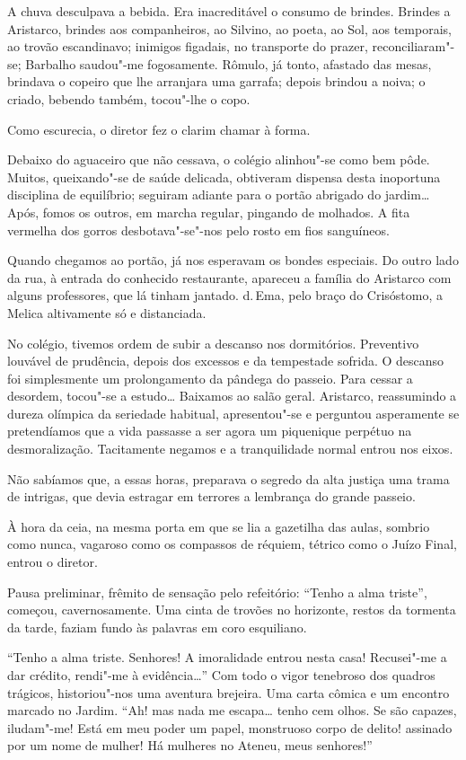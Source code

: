 A chuva desculpava a bebida.
Era inacreditável o consumo de brindes. Brindes a Aristarco, brindes
aos companheiros, ao Silvino, ao poeta, ao Sol, aos temporais, ao
trovão escandinavo; inimigos figadais, no transporte do prazer,
reconciliaram"-se; Barbalho saudou"-me fogosamente. Rômulo, já tonto,
afastado das mesas, brindava o copeiro que lhe arranjara uma garrafa;
depois brindou a noiva; o criado, bebendo também, tocou"-lhe o copo.

Como escurecia, o diretor fez o clarim chamar à forma. 

Debaixo do aguaceiro que não cessava, o colégio alinhou"-se como bem pôde.
Muitos, queixando"-se de saúde delicada, obtiveram dispensa desta
inoportuna disciplina de equilíbrio; seguiram adiante para o portão
abrigado do jardim\ldots{} Após, fomos os outros, em marcha regular,
pingando de molhados. A fita vermelha dos gorros desbotava"-se"-nos
pelo rosto em fios sanguíneos. 

Quando chegamos ao portão, já nos
esperavam os bondes especiais. Do outro lado da rua, à entrada do
conhecido restaurante, apareceu a família do Aristarco com alguns
professores, que lá tinham jantado. d.\,Ema, pelo braço do Crisóstomo, a
Melica altivamente só e distanciada. 

No colégio, tivemos ordem de subir
a descanso nos dormitórios. Preventivo louvável de prudência, depois
dos excessos e da tempestade sofrida. O descanso foi simplesmente um
prolongamento da pândega do passeio. Para cessar a desordem, tocou"-se
a estudo\ldots{} Baixamos ao salão geral. Aristarco, reassumindo a dureza
olímpica da seriedade habitual, apresentou"-se e perguntou asperamente
se pretendíamos que a vida passasse a ser agora um piquenique perpétuo
na desmoralização. Tacitamente negamos e a tranquilidade normal entrou
nos eixos. 

Não sabíamos que, a essas horas, preparava o segredo da alta
justiça uma trama de intrigas, que devia estragar em terrores a
lembrança do grande passeio. 

À hora da ceia, na mesma porta em que se
lia a gazetilha das aulas, sombrio como nunca, vagaroso como os
compassos de réquiem, tétrico como o Juízo Final, entrou o diretor.

Pausa preliminar, frêmito de sensação pelo refeitório: ``Tenho a alma
triste'', começou, cavernosamente. Uma cinta de trovões no 
horizonte, restos da tormenta da
tarde, faziam fundo às palavras em coro esquiliano. 

``Tenho a alma triste. Senhores! A imoralidade entrou nesta casa! 
Recusei"-me a dar crédito, rendi"-me à evidência\ldots{}'' 
Com todo o vigor tenebroso dos
quadros trágicos, historiou"-nos uma aventura brejeira. Uma carta
cômica e um encontro marcado no Jardim. ``Ah! mas nada me escapa\ldots{}
tenho cem olhos. Se são capazes, iludam"-me! Está em meu poder um
papel, monstruoso corpo de delito! assinado por um nome de mulher! Há
mulheres no Ateneu, meus senhores!'' 

